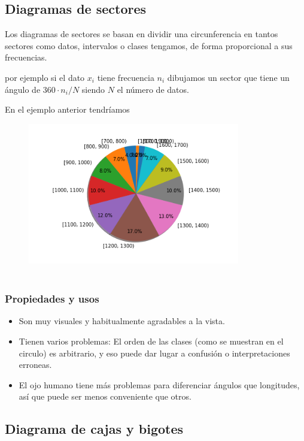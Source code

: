 \documentclass[
]{article}
\providecommand{\tightlist}{%
  \setlength{\itemsep}{0pt}\setlength{\parskip}{0pt}}
\begin{document}
\hypertarget{diagramas-de-sectores}{%
\subsection{Diagramas de sectores}\label{diagramas-de-sectores}}

Los diagramas de sectores se basan en dividir una circunferencia en
tantos sectores como datos, intervalos o clases tengamos, de forma
proporcional a sus frecuencias.

por ejemplo si el dato \(x_i\) tiene frecuencia \(n_i\) dibujamos un
sector que tiene un ángulo de \(360\cdot n_i / N\) siendo \(N\) el
número de datos.

En el ejemplo anterior tendríamos

\begin{figure}
\centering
\includegraphics[width=3.64583in,height=\textheight]{img/sectores.png}
\caption{~}
\end{figure}

\hypertarget{propiedades-y-usos-1}{%
\subsubsection{Propiedades y usos}\label{propiedades-y-usos-1}}

\begin{itemize}
\tightlist
\item
  Son muy visuales y habitualmente agradables a la vista.
\item
  Tienen varios problemas: El orden de las clases (como se muestran en
  el circulo) es arbitrario, y eso puede dar lugar a confusión o
  interpretaciones erroneas.
\item
  El ojo humano tiene más problemas para diferenciar ángulos que
  longitudes, así que puede ser menos conveniente que otros.
\end{itemize}

\hypertarget{diagrama-de-cajas-y-bigotes}{%
\subsection{Diagrama de cajas y
bigotes}\label{diagrama-de-cajas-y-bigotes}}
\end{document}
